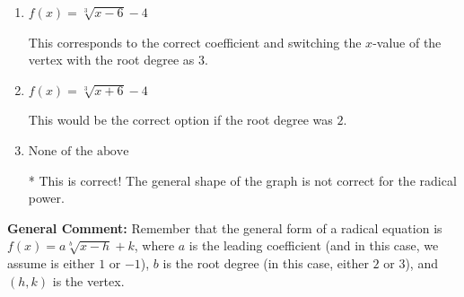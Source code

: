\documentclass{extbook}[14pt]
\begin{document}
\begin{enumerate}
{\begin{enumerate}[label=\Alph*.]
This corresponds to switching the coefficient AND switching the $x$-value of the vertex with the root degree as $3$.
\item \( f(x) = \sqrt[3]{x - 6} - 4 \)

This corresponds to the correct coefficient and switching the $x$-value of the vertex with the root degree as $3$.
\item \( f(x) = \sqrt[3]{x + 6} - 4 \)

This would be the correct option if the root degree was $2$.
\item \( \text{None of the above} \)

* This is correct! The general shape of the graph is not correct for the radical power.
\end{enumerate}

\textbf{General Comment:} Remember that the general form of a radical equation is $ f(x) = a \sqrt[b]{x - h} + k$, where $a$ is the leading coefficient (and in this case, we assume is either $1$ or $-1$), $b$ is the root degree (in this case, either $2$ or $3$), and $(h, k)$ is the vertex.
}
\end{enumerate}
\end{document}
